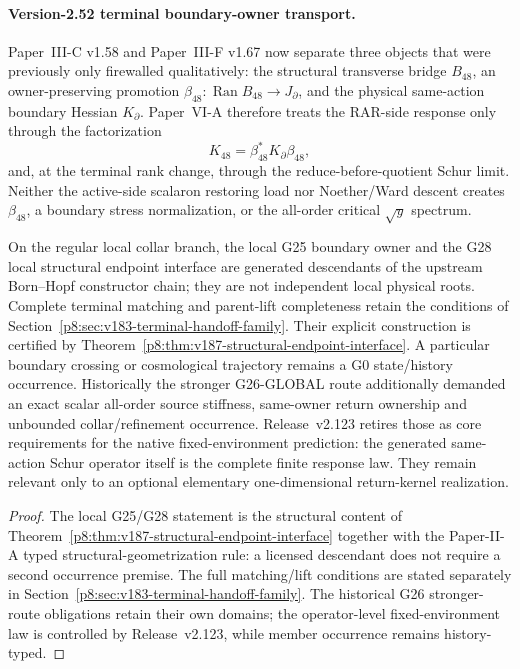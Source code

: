 \documentclass[12pt,a4paper]{article}
\begin{document}
\paragraph{Version-2.52 terminal boundary-owner transport.}
Paper~III-C v1.58 and Paper~III-F v1.67 now separate three objects that were
previously only firewalled qualitatively: the structural transverse bridge
\(B_{48}\), an owner-preserving promotion
\(\beta_{48}:\operatorname{Ran}B_{48}\to J_\partial\), and the physical
same-action boundary Hessian \(K_\partial\).  Paper~VI-A therefore treats the
RAR-side response only through the factorization
\[
 K_{48}=\beta_{48}^{*}K_\partial\beta_{48},
\]
and, at the terminal rank change, through the reduce-before-quotient Schur
limit.  Neither the active-side scalaron restoring load nor Noether/Ward
descent creates \(\beta_{48}\), a boundary stress normalization, or the
all-order critical \(\sqrt y\) spectrum.

\begin{corollary}
\label{p8:cor:v273-structural-boundary-interface-status}
On the regular local collar branch, the local G25 boundary owner and the G28
local structural endpoint interface are generated descendants of the
upstream Born--Hopf constructor chain; they are not independent local physical
roots. Complete terminal matching and parent-lift completeness retain the
conditions of Section~\ref{p8:sec:v183-terminal-handoff-family}.  Their explicit construction is certified by
Theorem~\ref{p8:thm:v187-structural-endpoint-interface}.  A particular
boundary crossing or cosmological trajectory remains a G0 state/history
occurrence.  Historically the stronger G26-GLOBAL route additionally demanded
an exact scalar all-order source stiffness, same-owner return ownership and
unbounded collar/refinement occurrence.  Release~v2.123 retires those as core
requirements for the native fixed-environment prediction: the generated
same-action Schur operator itself is the complete finite response law.  They
remain relevant only to an optional elementary one-dimensional return-kernel
realization.
\end{corollary}
\begin{proof}
The local G25/G28 statement is the structural content of
Theorem~\ref{p8:thm:v187-structural-endpoint-interface} together with the
Paper-II-A typed structural-geometrization rule: a licensed descendant does
not require a second occurrence premise.  The full matching/lift conditions are stated separately in
Section~\ref{p8:sec:v183-terminal-handoff-family}. The historical G26 stronger-route obligations retain their own domains; the
operator-level fixed-environment law is controlled by Release~v2.123, while
member occurrence remains history-typed.
\end{proof}
\end{document}
